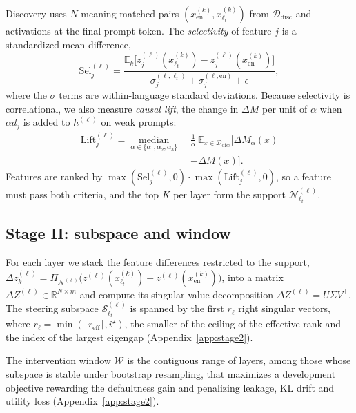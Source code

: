 \documentclass[11pt]{article}
\newcommand{\dM}{\ensuremath{\Delta M}\xspace}
\newcommand{\Ddisc}{\ensuremath{\mathcal{D}_{\mathrm{disc}}}\xspace}
\begin{document}
Discovery uses $N$ meaning-matched pairs $(x^{(k)}_{\mathrm{en}},x^{(k)}_{\ell_t})$ from \Ddisc and activations at the final prompt token. The \emph{selectivity} of feature $j$ is a standardized mean difference,
\begin{equation}
\mathrm{Sel}^{(\ell)}_j=\frac{\mathbb{E}_k\big[z^{(\ell)}_j(x^{(k)}_{\ell_t})-z^{(\ell)}_j(x^{(k)}_{\mathrm{en}})\big]}{\sigma^{(\ell,\ell_t)}_j+\sigma^{(\ell,\mathrm{en})}_j+\epsilon},
\end{equation}
where the $\sigma$ terms are within-language standard deviations. Because selectivity is correlational, we also measure \emph{causal lift}, the change in \dM per unit of $\alpha$ when $\alpha d_j$ is added to $h^{(\ell)}$ on weak prompts:
\begin{equation}
\begin{aligned}
\mathrm{Lift}^{(\ell)}_j=\operatorname*{median}_{\alpha\in\{\alpha_1,\alpha_2,\alpha_3\}}\;&\frac{1}{\alpha}\,\mathbb{E}_{x\in\Ddisc}\big[\Delta M_{\alpha}(x)\\[-2pt]
&-\Delta M(x)\big].
\end{aligned}
\end{equation}
Features are ranked by $\max(\mathrm{Sel}^{(\ell)}_j,0)\cdot\max(\mathrm{Lift}^{(\ell)}_j,0)$, so a feature must pass both criteria, and the top $K$ per layer form the support $\mathcal{N}^{(\ell)}_{\ell_t}$.

\subsection{Stage II: subspace and window}
\label{subsec:stage2}

For each layer we stack the feature differences restricted to the support, $\Delta z^{(\ell)}_k=\Pi_{\mathcal{N}^{(\ell)}}\big(z^{(\ell)}(x^{(k)}_{\ell_t})-z^{(\ell)}(x^{(k)}_{\mathrm{en}})\big)$, into a matrix $\Delta Z^{(\ell)}\in\mathbb{R}^{N\times m}$ and compute its singular value decomposition $\Delta Z^{(\ell)}=U\Sigma V^{\top}$. The steering subspace $\mathcal{S}^{(\ell)}_{\ell_t}$ is spanned by the first $r_\ell$ right singular vectors, where $r_\ell=\min(\lceil r_{\mathrm{eff}}\rceil,i^\star)$, the smaller of the ceiling of the effective rank and the index of the largest eigengap (Appendix~\ref{app:stage2}).

The intervention window $\mathcal{W}$ is the contiguous range of layers, among those whose subspace is stable under bootstrap resampling, that maximizes a development objective rewarding the defaultness gain and penalizing leakage, KL drift and utility loss (Appendix~\ref{app:stage2}).
\end{document}
